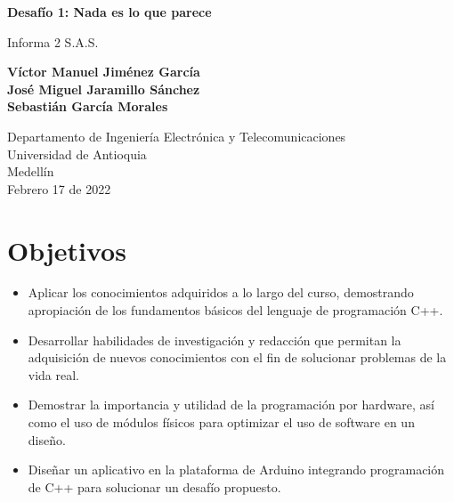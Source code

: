 \documentclass{article}
\begin{document}
\begin{titlepage}
    \begin{center}
        \vspace*{1cm}
            
        \Huge
        \textbf{Desafío 1: Nada es lo que parece}
            
        \vspace{0.5cm}
        \LARGE
        Informa 2 S.A.S.
            
        \vspace{1.5cm}
            
        \textbf{Víctor Manuel Jiménez García\\
                José Miguel Jaramillo Sánchez\\
                Sebastián García Morales}

        \vfill
            
        \vspace{0.8cm}
            
        \Large
        Departamento de Ingeniería Electrónica y Telecomunicaciones\\
        Universidad de Antioquia\\
        Medellín\\
        Febrero 17 de 2022
    \end{center}
\end{titlepage}

\tableofcontents

\newpage
\section{Objetivos}\label{objetivos}
\begin{itemize}
    \item Aplicar los conocimientos adquiridos a lo largo del curso, demostrando apropiación de los fundamentos básicos del lenguaje de programación C++.
    \item Desarrollar habilidades de investigación y redacción que permitan la adquisición de nuevos conocimientos con el fin de solucionar problemas de la vida real.
    \item Demostrar la importancia y utilidad de la programación por hardware, así como el uso de módulos físicos para optimizar el uso de software en un diseño.
    \item Diseñar un aplicativo en la plataforma de Arduino integrando programación de C++ para solucionar un desafío  propuesto.
\end{itemize}
\end{document}
